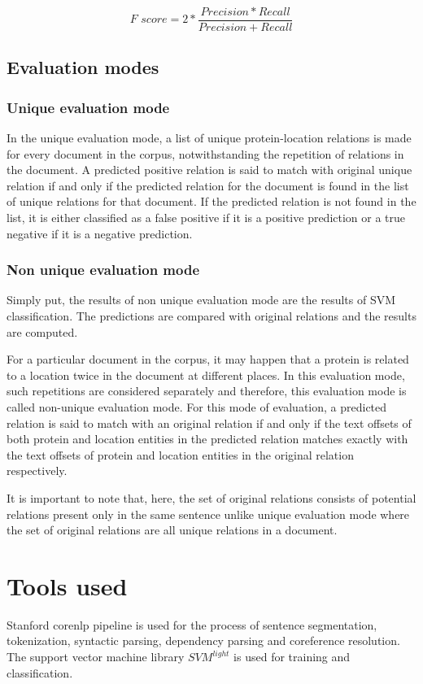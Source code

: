 $$
\textit{F score} = 2 * \frac{Precision * Recall}{Precision + Recall}
$$



\subsection{Evaluation modes} \label{subsec:Eval}

\subsubsection{Unique evaluation mode}\label{subsubsec:UniqEval}

In the unique evaluation mode, a list of unique protein-location relations is made for every document in the corpus, notwithstanding the repetition of relations in the document. A predicted positive relation is said to match with original unique relation if and only if the predicted relation for the document is found in the list of unique relations for that document. If the predicted relation is not found in the list, it is either classified as a false positive if it is a positive prediction or a true negative if it is a negative prediction.


\subsubsection{Non unique evaluation mode}\label{subsubsec:NonUniqEval}

Simply put, the results of non unique evaluation mode are the results of SVM classification. The predictions are compared with original relations and the results are computed. 

For a particular document in the corpus, it may happen that a protein is related to a location twice in the document at different places. In this evaluation mode,  such repetitions are considered separately and therefore, this evaluation mode is called non-unique evaluation mode. For this mode of evaluation, a predicted relation is said to match with an original relation if and only if the text offsets of both protein and location entities in the predicted relation matches exactly with the text offsets of protein and location entities in the original relation respectively. 

It is important to note that, here, the set of original relations consists of potential relations present only in the same sentence unlike unique evaluation mode where the set of original relations are all unique relations in a document.

\section{Tools used}\label{sec:tools}

Stanford corenlp pipeline \cite{manning2014stanford} is used for the process of sentence segmentation, tokenization, syntactic parsing, dependency parsing and coreference resolution. The support vector machine library $SVM^{light}$ \cite{joachims1999making} is used for training and classification.
